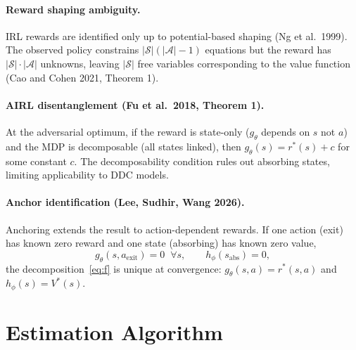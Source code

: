 \documentclass[11pt]{article}
\newcommand{\calA}{\mathcal{A}}
\newcommand{\calS}{\mathcal{S}}
\begin{document}
\paragraph{Reward shaping ambiguity.} IRL rewards are identified only up to potential-based shaping (Ng et al.\ 1999). The observed policy constrains $|\calS|(|\calA|-1)$ equations but the reward has $|\calS| \cdot |\calA|$ unknowns, leaving $|\calS|$ free variables corresponding to the value function (Cao and Cohen 2021, Theorem 1).

\paragraph{AIRL disentanglement (Fu et al.\ 2018, Theorem 1).} At the adversarial optimum, if the reward is state-only ($g_\theta$ depends on $s$ not $a$) and the MDP is decomposable (all states linked), then $g_\theta(s) = r^*(s) + c$ for some constant $c$. The decomposability condition rules out absorbing states, limiting applicability to DDC models.

\paragraph{Anchor identification (Lee, Sudhir, Wang 2026).} Anchoring extends the result to action-dependent rewards. If one action (exit) has known zero reward and one state (absorbing) has known zero value,
\begin{equation}
\label{eq:anchors}
g_\theta(s, a_{\text{exit}}) = 0 \;\; \forall s, \qquad h_\phi(s_{\text{abs}}) = 0,
\end{equation}
the decomposition~\eqref{eq:f} is unique at convergence: $g_\theta(s,a) = r^*(s,a)$ and $h_\phi(s) = V^*(s)$.

\section{Estimation Algorithm}
\end{document}
